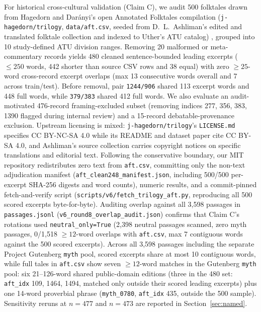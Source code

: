 \documentclass[conference]{IEEEtran}
\begin{document}
For historical cross-cultural validation (Claim C), we audit 500 folktales drawn from Hagedorn and Dar\'anyi's open Annotated Folktales compilation (\texttt{j-hagedorn/trilogy}, \texttt{data/aft.csv}, seeded from D.~L.~Ashliman's edited and translated folktale collection and indexed to Uther's ATU catalog) \cite{hagedorn2022bearing,uther2004types}, grouped into 10 study-defined ATU division ranges. Removing 20 malformed or meta-commentary records yields 480 cleaned sentence-bounded leading excerpts ($\le 250$ words, 442 shorter than source CSV rows and 38 equal) with zero $\ge 25$-word cross-record excerpt overlaps (max 13 consecutive words overall and 7 across train/test). Before removal, pair \texttt{1244/906} shared 113 excerpt words and 448 full words, while \texttt{379/383} shared 412 full words. We also evaluate an audit-motivated 476-record framing-excluded subset (removing indices 277, 356, 383, 1390 flagged during internal review) and a 15-record debatable-provenance exclusion. Upstream licensing is mixed: \texttt{j-hagedorn/trilogy}'s \texttt{LICENSE.md} specifies CC BY-NC-SA 4.0 while its README and dataset paper cite CC BY-SA 4.0, and Ashliman's source collection carries copyright notices on specific translations and editorial text. Following the conservative boundary, our MIT repository redistributes zero text from \texttt{aft.csv}, committing only the non-text adjudication manifest (\texttt{aft\_clean248\_manifest.json}, including 500/500 per-excerpt SHA-256 digests and word counts), numeric results, and a commit-pinned fetch-and-verify script (\texttt{scripts/v6/fetch\_trilogy\_aft.py}, reproducing all 500 scored excerpts byte-for-byte). Auditing overlap against all 3,598 passages in \texttt{passages.jsonl} (\texttt{v6\_round8\_overlap\_audit.json}) confirms that Claim C's rotations used \texttt{neutral\_only=True} (2,398 neutral passages scanned, zero myth passages, 0/1,518 $\ge 12$-word overlaps with \texttt{aft.csv}, max 7 contiguous words against the 500 scored excerpts). Across all 3,598 passages including the separate Project Gutenberg \texttt{myth} pool, scored excerpts share at most 10 contiguous words, while full tales in \texttt{aft.csv} show seven $\ge 12$-word matches in the Gutenberg \texttt{myth} pool: six 21--126-word shared public-domain editions (three in the 480 set: \texttt{aft\_idx} 109, 1464, 1494, matched only outside their scored leading excerpts) plus one 14-word proverbial phrase (\texttt{myth\_0780}, \texttt{aft\_idx} 435, outside the 500 sample). Sensitivity reruns at $n=477$ and $n=473$ are reported in Section~\ref{sec:named}.
\end{document}
